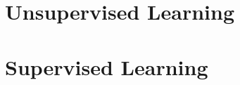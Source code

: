 
\section{Unsupervised Learning}
\label{ml:unsupervised}




\section{Supervised Learning}
\label{ml:supervised}



